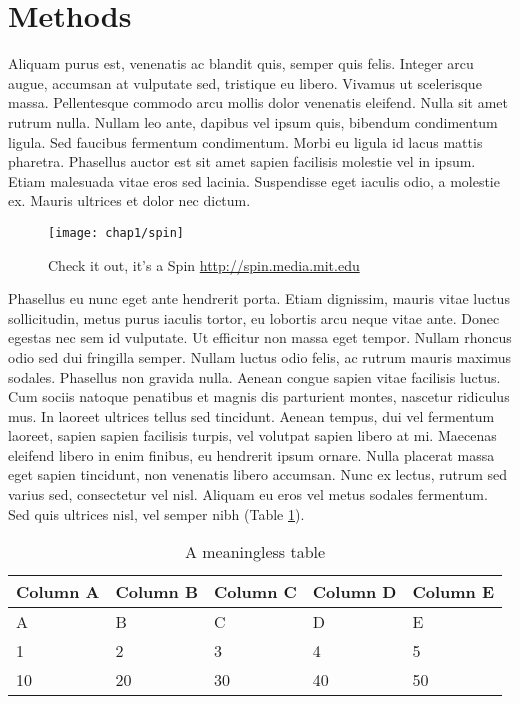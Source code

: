 \section{Methods}

Aliquam purus est, venenatis ac blandit quis, semper quis felis. Integer arcu augue, accumsan at vulputate sed, tristique eu libero. Vivamus ut scelerisque massa. Pellentesque commodo arcu mollis dolor venenatis eleifend. Nulla sit amet rutrum nulla. Nullam leo ante, dapibus vel ipsum quis, bibendum condimentum ligula. Sed faucibus fermentum condimentum. Morbi eu ligula id lacus mattis pharetra. Phasellus auctor est sit amet sapien facilisis molestie vel in ipsum. Etiam malesuada vitae eros sed lacinia. Suspendisse eget iaculis odio, a molestie ex. Mauris ultrices et dolor nec dictum.

\begin{figure}[htb]
 	\texttt{[image: chap1/spin]}               
 	 \caption{Check it out, it's a Spin \url{http://spin.media.mit.edu}}
  	\label{fig:spin}
\end{figure}

Phasellus eu nunc eget ante hendrerit porta. Etiam dignissim, mauris vitae luctus sollicitudin, metus purus iaculis tortor, eu lobortis arcu neque vitae ante. Donec egestas nec sem id vulputate. Ut efficitur non massa eget tempor. Nullam rhoncus odio sed dui fringilla semper. Nullam luctus odio felis, ac rutrum mauris maximus sodales. Phasellus non gravida nulla. Aenean congue sapien vitae facilisis luctus. Cum sociis natoque penatibus et magnis dis parturient montes, nascetur ridiculus mus. In laoreet ultrices tellus sed tincidunt. Aenean tempus, dui vel fermentum laoreet, sapien sapien facilisis turpis, vel volutpat sapien libero at mi. Maecenas eleifend libero in enim finibus, eu hendrerit ipsum ornare. Nulla placerat massa eget sapien tincidunt, non venenatis libero accumsan. Nunc ex lectus, rutrum sed varius sed, consectetur vel nisl. Aliquam eu eros vel metus sodales fermentum. Sed quis ultrices nisl, vel semper nibh (Table \ref{tab:sample_table}).

\begin{table}[ht]
  \centering
  \begin{tabular}{l l l l l}
    \toprule
    Column A & Column B & Column C & Column D & Column E \\
    \midrule
    A & B & C & D & E \\
    1 & 2 & 3 & 4 & 5 \\
    10 & 20 & 30 & 40 & 50 \\
    \bottomrule
  \end{tabular}
  \caption{A meaningless table}
  \label{tab:sample_table}
\end{table}

